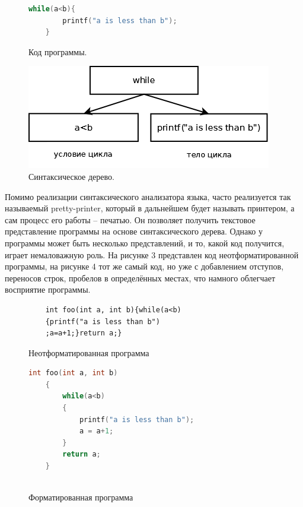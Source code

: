 \documentclass{matmex-diploma-custom}
\begin{document}
\begin{figure}[h]
  \centering
  \begin{minipage}[h]{0.4\textwidth}
    \begin{lstlisting}[language = C]
    while(a<b){
        printf("a is less than b");
    }
    \end{lstlisting}
    
    
    \caption{Код программы.}
    \label{Код}
  \end{minipage}
  \hfill
  \begin{minipage}[h]{0.4\textwidth}
    \includegraphics[width=\textwidth]{whileTree.png}
    \caption{Синтаксическое дерево.}
    \label{Дерево}
  \end{minipage}
\end{figure}

Помимо реализации синтаксического анализатора языка, часто реализуется так называемый pretty-printer, который в дальнейшем будет называть принтером, а сам процесс его работы -- печатью. Он позволяет получить текстовое представление программы на основе синтаксического дерева. Однако у программы может быть несколько представлений, и то, какой код получится, играет немаловажную роль. На рисунке 3 представлен код неотформатированной программы, на рисунке 4 тот же самый код, но уже с добавлением отступов, переносов строк, пробелов в 
определённых местах, что намного облегчает восприятие программы.

\begin{figure}[h]
\centering

\begin{verbatim}
    int foo(int a, int b){while(a<b)
    {printf("a is less than b")
    ;a=a+1;}return a;}
\end{verbatim}

\caption{Неотформатированная программа}
\label{Неотформат}
\end{figure}

\begin{figure}[h]
\centering

\begin{lstlisting}[language = C]
    int foo(int a, int b)
    {
        while(a<b)
        {
            printf("a is less than b");
            a = a+1;
        }
        return a;
    }
    
\end{lstlisting}

\caption{Форматированная программа}
\label{Отформат}
\end{figure}
\end{document}
